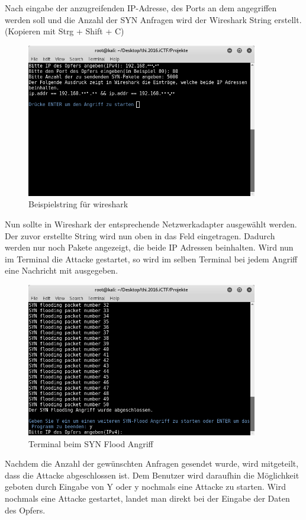 Nach eingabe der anzugreifenden IP-Adresse, des Ports an dem angegriffen werden soll und die Anzahl der SYN Anfragen wird der Wireshark String erstellt.(Kopieren mit Strg + Shift + C)
	\begin{figure}[H]
		\centering
		\includegraphics[width=0.9\textwidth]{images/DOS/wireshark_string.png}
		\caption{Beispielstring für wireshark}
		\label{fig:wireshark string}
	\end{figure}
Nun sollte in Wireshark der entsprechende Netzwerkadapter ausgewählt werden. Der zuvor erstellte String wird nun oben in das Feld eingetragen. Dadurch werden nur noch Pakete angezeigt, die beide IP Adressen beinhalten.
Wird nun im Terminal die Attacke gestartet, so wird im selben Terminal bei jedem Angriff eine Nachricht mit ausgegeben.
	\begin{figure}[H]
		\centering
		\includegraphics[width=0.9\textwidth]{images/DOS/synattack_example.png}
		\caption{Terminal beim SYN Flood Angriff}
		\label{fig:synattack example}
	\end{figure}
Nachdem die Anzahl der gewünschten Anfragen gesendet wurde, wird mitgeteilt, dass die Attacke abgeschlossen ist.
Dem Benutzer wird daraufhin die Möglichkeit geboten durch Eingabe von Y oder y nochmals eine Attacke zu starten.
Wird nochmals eine Attacke gestartet, landet man direkt bei der Eingabe der Daten des Opfers. 



